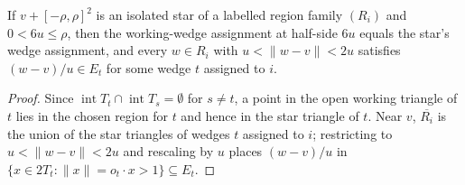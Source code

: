 \begin{lemma}
    \label{thm:area_law_star_same_label_bound}
    \leanok
    If $v+[-\rho,\rho]^2$ is an isolated star of a labelled region family $(R_i)$ and
    $0<6u\le\rho$, then the working-wedge assignment at half-side $6u$ equals the star's
    wedge assignment, and every $w\in R_i$ with $u<\|w-v\|<2u$ satisfies $(w-v)/u\in E_t$
    for some wedge $t$ assigned to $i$.
\end{lemma}

\begin{proof}
    \leanok
    Since $\operatorname{int}T_t\cap\operatorname{int}T_s=\emptyset$ for $s\ne t$, a point in the
    open working triangle of $t$ lies in the chosen region for $t$ and hence in the star triangle
    of $t$. Near $v$, $\overline{R_i}$ is the union of the star triangles of wedges $t$ assigned to $i$;
    restricting to $u<\|w-v\|<2u$ and rescaling by $u$ places $(w-v)/u$ in
    $\{x\in2T_t:\|x\|=o_t\cdot x>1\}\subseteq E_t$.
\end{proof}

